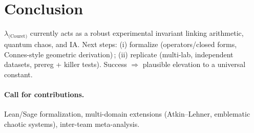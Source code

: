 \documentclass[11pt,a4paper]{article}
\def\lambda{λ}%
\def\textbf#1{#1}%
\def\emph#1{#1}%
\begin{document}
\section{Conclusion}
$\lambda_{\text{(Couret)}}$ currently acts as a \emph{robust experimental invariant}
linking arithmetic, quantum chaos, and IA.
Next steps: (i) \textbf{formalize} (operators/closed forms, Connes-style geometric derivation)\,; (ii) \textbf{replicate} (multi-lab, independent datasets, prereg + killer tests). Success $\Rightarrow$ plausible elevation to a \emph{universal constant}.

\paragraph{Call for contributions.}
Lean/Sage formalization, multi-domain extensions (Atkin–Lehner, emblematic chaotic systems), inter-team meta-analysis.

\printbibliography
{}
\end{document}
